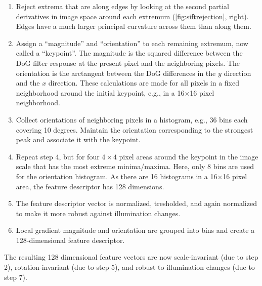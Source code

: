 \begin{enumerate}
\item Reject extrema that are along edges by looking at the second partial derivatives in image space around each extremum (\cref{fig:siftrejection}, right). Edges have a much larger principal curvature across them than along them.
\item Assign a ``magnitude'' and ``orientation'' to each remaining extremum, now called a ``keypoint''. The magnitude is the squared difference between the DoG filter response at the present pixel and the neighboring pixels. The orientation is the arctangent between the DoG differences in the $y$ direction and the $x$ direction. These calculations are made for all pixels in a fixed neighborhood around the initial keypoint, e.g., in a 16$\times$16 pixel neighborhood.
\item Collect orientations of neighboring pixels in a histogram, e.g., 36 bins each covering 10 degrees. Maintain the orientation corresponding to the strongest peak and associate it with the keypoint.
\item Repeat step 4, but for four $4\times4$ pixel areas around the keypoint in the image scale that has the most extreme minima/maxima. Here, only 8 bins are used for the orientation histogram. As there are 16 histograms in a 16$\times$16 pixel area, the feature descriptor has 128 dimensions.
\item The feature descriptor vector is normalized, tresholded, and again normalized to make it more robust against illumination changes.
\item Local gradient magnitude and orientation are grouped into bins and create a 128-dimensional feature descriptor.
\end{enumerate}

The resulting 128 dimensional feature vectors are now scale-invariant (due to step 2), rotation-invariant (due to step 5), and robust to illumination changes (due to step 7).

